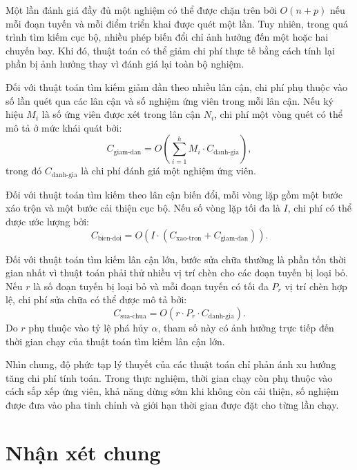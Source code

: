 Một lần đánh giá đầy đủ một nghiệm có thể được chặn trên bởi $O(n+p)$ nếu mỗi đoạn tuyến và mỗi điểm triển khai được quét một lần. Tuy nhiên, trong quá trình tìm kiếm cục bộ, nhiều phép biến đổi chỉ ảnh hưởng đến một hoặc hai chuyến bay. Khi đó, thuật toán có thể giảm chi phí thực tế bằng cách tính lại phần bị ảnh hưởng thay vì đánh giá lại toàn bộ nghiệm.

Đối với thuật toán tìm kiếm giảm dần theo nhiều lân cận, chi phí phụ thuộc vào số lần quét qua các lân cận và số nghiệm ứng viên trong mỗi lân cận. Nếu ký hiệu $M_i$ là số ứng viên được xét trong lân cận $N_i$, chi phí một vòng quét có thể mô tả ở mức khái quát bởi:
\begin{equation}
    C_{\text{giam-dan}} = O\left(\sum_{i=1}^{h} M_i \cdot C_{\text{danh-gia}}\right),
    \label{eq:chapter4-vnd-complexity}
\end{equation}
trong đó $C_{\text{danh-gia}}$ là chi phí đánh giá một nghiệm ứng viên.

Đối với thuật toán tìm kiếm theo lân cận biến đổi, mỗi vòng lặp gồm một bước xáo trộn và một bước cải thiện cục bộ. Nếu số vòng lặp tối đa là $I$, chi phí có thể được ước lượng bởi:
\begin{equation}
    C_{\text{bien-doi}} = O\left(I \cdot (C_{\text{xao-tron}} + C_{\text{giam-dan}})\right).
    \label{eq:chapter4-vns-complexity}
\end{equation}

Đối với thuật toán tìm kiếm lân cận lớn, bước sửa chữa thường là phần tốn thời gian nhất vì thuật toán phải thử nhiều vị trí chèn cho các đoạn tuyến bị loại bỏ. Nếu $r$ là số đoạn tuyến bị loại bỏ và mỗi đoạn tuyến có tối đa $P_r$ vị trí chèn hợp lệ, chi phí sửa chữa có thể được mô tả bởi:
\begin{equation}
    C_{\text{sua-chua}} = O\left(r \cdot P_r \cdot C_{\text{danh-gia}}\right).
    \label{eq:chapter4-lns-repair-complexity}
\end{equation}
Do $r$ phụ thuộc vào tỷ lệ phá hủy $\alpha$, tham số này có ảnh hưởng trực tiếp đến thời gian chạy của thuật toán tìm kiếm lân cận lớn.

Nhìn chung, độ phức tạp lý thuyết của các thuật toán chỉ phản ánh xu hướng tăng chi phí tính toán. Trong thực nghiệm, thời gian chạy còn phụ thuộc vào cách sắp xếp ứng viên, khả năng dừng sớm khi không còn cải thiện, số nghiệm được đưa vào pha tinh chỉnh và giới hạn thời gian được đặt cho từng lần chạy.

\section{Nhận xét chung}


